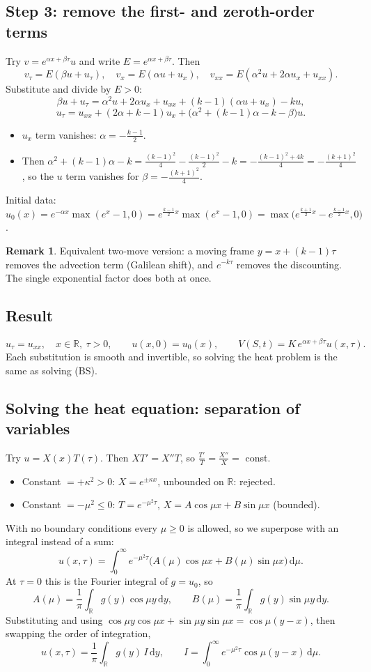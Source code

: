 \documentclass[11pt]{article}
\newcommand{\dd}{\,\mathrm d}
\newcommand{\R}{\mathbb R}
\theoremstyle{definition}
\newtheorem*{remark}{Remark}
\begin{document}
\subsection{Step 3: remove the first- and zeroth-order terms}
Try $v=e^{\alpha x+\beta\tau}u$ and write $E=e^{\alpha x+\beta\tau}$. Then
\[
  v_\tau=E(\beta u+u_\tau),\quad v_x=E(\alpha u+u_x),\quad v_{xx}=E(\alpha^2u+2\alpha u_x+u_{xx}).
\]
Substitute and divide by $E>0$:
\[
  \beta u+u_\tau=\alpha^2u+2\alpha u_x+u_{xx}+(k-1)(\alpha u+u_x)-ku,
\]
\[
  u_\tau=u_{xx}+(2\alpha+k-1)u_x+\big(\alpha^2+(k-1)\alpha-k-\beta\big)u .
\]
\begin{itemize}[nosep]
  \item $u_x$ term vanishes: $\alpha=-\frac{k-1}{2}$.
  \item Then $\alpha^2+(k-1)\alpha-k=\frac{(k-1)^2}{4}-\frac{(k-1)^2}{2}-k=-\frac{(k-1)^2+4k}{4}=-\frac{(k+1)^2}{4}$,
  so the $u$ term vanishes for $\beta=-\frac{(k+1)^2}{4}$.
\end{itemize}
Initial data: $u_0(x)=e^{-\alpha x}\max(e^x-1,0)=e^{\frac{k-1}{2}x}\max(e^x-1,0)
=\max\big(e^{\frac{k+1}{2}x}-e^{\frac{k-1}{2}x},0\big)$.

\begin{remark}
Equivalent two-move version: a moving frame $y=x+(k-1)\tau$ removes the advection term (Galilean shift), and
$e^{-k\tau}$ removes the discounting. The single exponential factor does both at once.
\end{remark}

\subsection{Result}
\[
  u_\tau=u_{xx},\quad x\in\R,\ \tau>0,\qquad u(x,0)=u_0(x),\qquad
  V(S,t)=K\,e^{\alpha x+\beta\tau}u(x,\tau).
\]
Each substitution is smooth and invertible, so solving the heat problem is the same as solving (BS).

\subsection{Solving the heat equation: separation of variables}
Try $u=X(x)T(\tau)$. Then $XT'=X''T$, so $\frac{T'}{T}=\frac{X''}{X}=$ const.
\begin{itemize}[nosep]
  \item Constant $=+\kappa^2>0$: $X=e^{\pm\kappa x}$, unbounded on $\R$: rejected.
  \item Constant $=-\mu^2\le0$: $T=e^{-\mu^2\tau}$, $X=A\cos\mu x+B\sin\mu x$ (bounded).
\end{itemize}
With no boundary conditions every $\mu\ge0$ is allowed, so we superpose with an integral instead of a sum:
\[
  u(x,\tau)=\int_0^\infty e^{-\mu^2\tau}\big(A(\mu)\cos\mu x+B(\mu)\sin\mu x\big)\dd\mu .
\]
At $\tau=0$ this is the Fourier integral of $g=u_0$, so
\[
  A(\mu)=\frac1\pi\int_\R g(y)\cos\mu y\dd y,\qquad B(\mu)=\frac1\pi\int_\R g(y)\sin\mu y\dd y .
\]
Substituting and using $\cos\mu y\cos\mu x+\sin\mu y\sin\mu x=\cos\mu(y-x)$, then swapping the order of integration,
\[
  u(x,\tau)=\frac1\pi\int_\R g(y)\,I\dd y,\qquad I=\int_0^\infty e^{-\mu^2\tau}\cos\mu(y-x)\dd\mu .
\]
\end{document}
